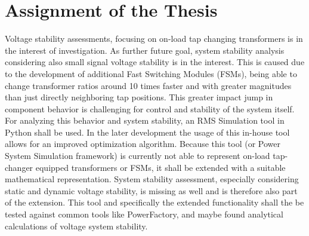 
\chapter*{Assignment of the Thesis}
\thispagestyle{plain.scrheadings}

Voltage stability assessments, focusing on on-load tap changing transformers is in the interest of investigation. As further future goal, system stability analysis considering also small signal voltage stability is in the interest. This is caused due to the development of additional Fast Switching Modules (FSMs), being able to change transformer ratios around 10 times faster and with greater magnitudes than just directly neighboring tap positions. This greater impact jump in component behavior is challenging for control and stability of the system itself. For analyzing this behavior and system stability, an RMS Simulation tool in Python shall be used. In the later development the usage of this in-house tool allows for an improved optimization algorithm. Because this tool (or Power System Simulation framework) is currently not able to represent on-load tap-changer equipped transformers or FSMs, it shall be extended with a suitable mathematical representation. System stability assessment, especially considering static and dynamic voltage stability, is missing as well and is therefore also part of the extension. This tool and specifically the extended functionality shall the be tested against common tools like PowerFactory, and maybe found analytical calculations of voltage system stability.


